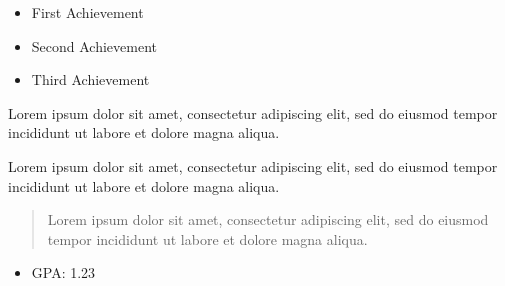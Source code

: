 \documentclass[10pt,a4paper,ragged2e,withhyper]{altacv}
\begin{document}
\begin{paracol}{2}
            \begin{itemize}
                \item First Achievement
                \item Second Achievement
                \item Third Achievement
            \end{itemize}

            \smallskip
            \par
            Lorem ipsum dolor sit amet, consectetur adipiscing elit, sed do eiusmod tempor incididunt ut labore et dolore magna aliqua.
            
            \divider
            
            \smallskip
            \par
            Lorem ipsum dolor sit amet, consectetur adipiscing elit, sed do eiusmod tempor incididunt ut labore et dolore magna aliqua.
            
        \newpage

        \switchcolumn
        
            \begin{quote}
                Lorem ipsum dolor sit amet, consectetur adipiscing elit, sed do eiusmod tempor incididunt ut labore et dolore magna aliqua.
            \end{quote}


            \divider
            

        
            \begin{itemize}
                \item GPA: 1.23
            \end{itemize}
            \divider
            

\end{paracol}
\end{document}
